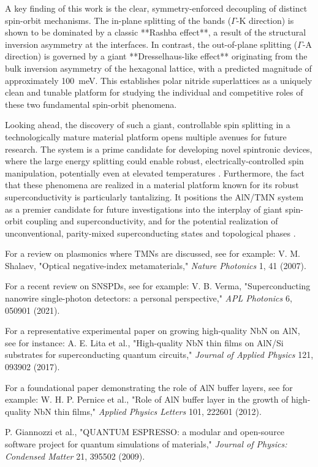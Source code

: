 \documentclass[aps,prl,reprint,superscriptaddress]{revtex4-2}
\begin{document}
A key finding of this work is the clear, symmetry-enforced decoupling of distinct spin-orbit mechanisms. The in-plane splitting of the bands ($\Gamma$-K direction) is shown to be dominated by a classic **Rashba effect**, a result of the structural inversion asymmetry at the interfaces. In contrast, the out-of-plane splitting ($\Gamma$-A direction) is governed by a giant **Dresselhaus-like effect** originating from the bulk inversion asymmetry of the hexagonal lattice, with a predicted magnitude of approximately 100~meV. This establishes polar nitride superlattices as a uniquely clean and tunable platform for studying the individual and competitive roles of these two fundamental spin-orbit phenomena.

Looking ahead, the discovery of such a giant, controllable spin splitting in a technologically mature material platform opens multiple avenues for future research. The system is a prime candidate for developing novel spintronic devices, where the large energy splitting could enable robust, electrically-controlled spin manipulation, potentially even at elevated temperatures \cite{zutic_spintronics_2004}. Furthermore, the fact that these phenomena are realized in a material platform known for its robust superconductivity is particularly tantalizing. It positions the AlN/TMN system as a premier candidate for future investigations into the interplay of giant spin-orbit coupling and superconductivity, and for the potential realization of unconventional, parity-mixed superconducting states and topological phases \cite{sato_topological_2017}.



\begin{thebibliography}{9}

For a review on plasmonics where TMNs are discussed, see for example: V. M. Shalaev, "Optical negative-index metamaterials," \textit{Nature Photonics} 1, 41 (2007).

For a recent review on SNSPDs, see for example: V. B. Verma, "Superconducting nanowire single-photon detectors: a personal perspective," \textit{APL Photonics} 6, 050901 (2021).

For a representative experimental paper on growing high-quality NbN on AlN, see for instance: A. E. Lita et al., "High-quality NbN thin films on AlN/Si substrates for superconducting quantum circuits," \textit{Journal of Applied Physics} 121, 093902 (2017).

For a foundational paper demonstrating the role of AlN buffer layers, see for example: W. H. P. Pernice et al., "Role of AlN buffer layer in the growth of high-quality NbN thin films," \textit{Applied Physics Letters} 101, 222601 (2012).

P. Giannozzi et al., "QUANTUM ESPRESSO: a modular and open-source software project for quantum simulations of materials," \textit{Journal of Physics: Condensed Matter} 21, 395502 (2009).

\end{thebibliography}
\end{document}
